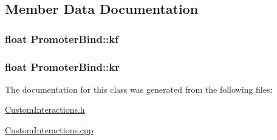 \subsection{Member Data Documentation}
\hypertarget{classPromoterBind_a1d7aec80f269b55174bfb6de07444323}{
\subsubsection[{kf}]{\setlength{\rightskip}{0pt plus 5cm}float {\bf PromoterBind::kf}}}
\label{classPromoterBind_a1d7aec80f269b55174bfb6de07444323}
\hypertarget{classPromoterBind_a8c4425cb2db8caed97296e4a539b93d9}{
\subsubsection[{kr}]{\setlength{\rightskip}{0pt plus 5cm}float {\bf PromoterBind::kr}}}
\label{classPromoterBind_a8c4425cb2db8caed97296e4a539b93d9}


The documentation for this class was generated from the following files:\begin{DoxyCompactItemize}
\item 
\hyperlink{CustomInteractions_8h}{CustomInteractions.h}\item 
\hyperlink{CustomInteractions_8cpp}{CustomInteractions.cpp}\end{DoxyCompactItemize}
